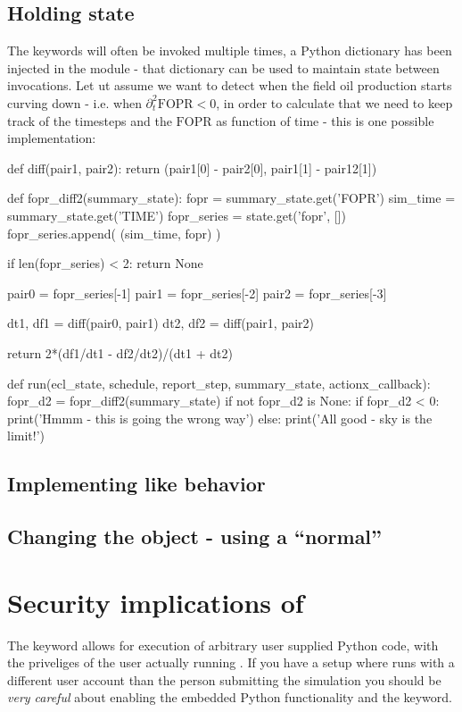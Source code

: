 \subsection{Holding state}
The \pyaction{} keywords will often be invoked multiple times, a Python
dictionary  has been injected in the module - that dictionary
can be used to maintain state between invocations. Let ut assume we want to
detect when the field oil production starts curving down - i.e. when
$\partial^2_{t} \mathrm{FOPR} < 0$, in order to calculate that we need to keep
track of the timesteps and the $\mathrm{FOPR}$ as function of time - this is one
possible implementation:
\begin{code}
def diff(pair1, pair2):
    return (pair1[0] - pair2[0], pair1[1] - pair12[1])   

def fopr_diff2(summary_state):
    fopr = summary_state.get('FOPR')
    sim_time = summary_state.get('TIME')
    fopr_series = state.get('fopr', [])
    fopr_series.append( (sim_time, fopr) )

    if len(fopr_series) < 2:
       return None

    pair0 = fopr_series[-1]
    pair1 = fopr_series[-2]
    pair2 = fopr_series[-3]

    dt1, df1 = diff(pair0, pair1)
    dt2, df2 = diff(pair1, pair2)

    return 2*(df1/dt1 - df2/dt2)/(dt1 + dt2)

def run(ecl_state, schedule, report_step, summary_state, actionx_callback):
    fopr_d2 = fopr_diff2(summary_state)
    if not fopr_d2 is None:
       if fopr_d2 < 0:
           print('Hmmm - this is going the wrong way')
       else:
           print('All good - sky is the limit!')
\end{code}


\subsection{Implementing \udq{} like behavior}

\subsection{Changing the  object - using a ``normal'' \actionx{}}


\section{Security implications of \pyaction{}}
The \pyaction{} keyword allows for execution of arbitrary user supplied Python
code, with the priveliges of the user actually running \flow{}. If you have a
setup where \flow{} runs with a different user account than the person
submitting the simulation you should be \emph{very careful} about enabling the
embedded Python functionality and the \pyaction{} keyword.


